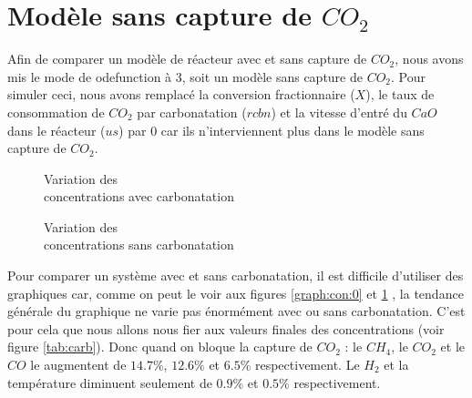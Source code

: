 \documentclass[11pt]{report}
\begin{document}
        \section{Modèle sans capture de $CO_2$}
            Afin de comparer un modèle de réacteur avec et sans capture de $CO_2$,
            nous avons mis le mode de odefunction à 3, soit un modèle sans capture de $CO_2$.
            Pour simuler ceci, nous avons remplacé la conversion fractionnaire ($X$),
            le taux de consommation de $CO_2$ par carbonatation ($rcbn$)
            et la vitesse d'entré du $CaO$ dans le réacteur ($us$)
            par $0$ car ils n'interviennent plus dans le modèle sans capture de $CO_2$.
            \par
            \begin{figure}[h]
                \centering
                \begin{minipage}{0.45\textwidth}
                    \centering
                    
                    \caption{Variation des\\ concentrations avec carbonatation}
                    \label{graph:con:0}
                \end{minipage}
                \begin{minipage}{0.45\textwidth}
                    \centering
                    
                    \caption{Variation des\\ concentrations sans carbonatation}
                    \label{graph:con:1}
                \end{minipage}
            \end{figure}
            Pour comparer un système avec et sans carbonatation,
            il est difficile d'utiliser des graphiques car,
            comme on peut le voir aux figures \ref{graph:con:0} et \ref{graph:con:1} ,
            la tendance générale du graphique ne varie pas énormément avec ou sans carbonatation.
            C'est pour cela que nous allons nous fier aux valeurs finales des concentrations (voir figure \ref{tab:carb}).
            Donc quand on bloque la capture de $CO_2$ : le $CH_4$, le $CO_2$
            et le $CO$  le  augmentent de $14.7\%$, $12.6\%$ et $6.5\%$ respectivement.
            Le $H_2$ et la température diminuent seulement de $0.9\%$ et $0.5\%$ respectivement.
\end{document}
